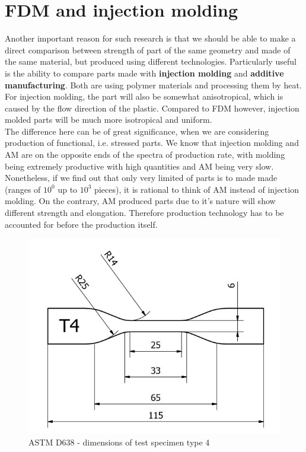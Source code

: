 \documentclass[a4paper, twoside, 11pt]{report}
\begin{document}
\section{FDM and injection molding}
Another important reason for such research is that we should be able to make a direct comparison between strength of part of the same geometry and made of the same material, but produced using different technologies. Particularly useful is the ability to compare parts made with \textbf{injection molding} and \textbf{additive manufacturing}. Both are using polymer materials and processing them by heat. For injection molding, the part will also be somewhat anisotropical, which is caused by the flow direction of the plastic. Compared to FDM however, injection molded parts will be much more isotropical and uniform.\\
The difference here can be of great significance, when we are considering production of functional, i.e. stressed parts. We know that injection molding and AM are on the opposite ends of the spectra of production rate, with molding being extremely productive with high quantities and AM being very slow. Nonetheless, if we find out that only very limited of parts is to made made (ranges of $10^0$ up to $10^3$ pieces), it is rational to think of AM instead of injection molding. On the contrary, AM produced parts due to it's nature will show different strength and elongation. Therefore production technology has to be accounted for before the production itself.
\begin{figure}[b]
\centering
\includegraphics[scale=0.6]{testSpecimenDimensions}
\caption{ASTM D638 - dimensions of test specimen type 4}
\end{figure}
\
\newpage
\end{document}
